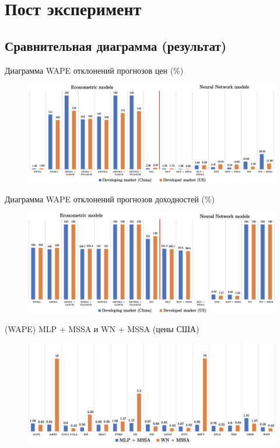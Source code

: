 \documentclass[11pt, aspectratio= 169]{beamer}
\begin{document}
	\section{Пост эксперимент}
	\subsection{Сравнительная диаграмма (результат)}
	\begin{frame}{Диаграмма WAPE отклонений прогнозов цен (\%)}
		\begin{figure}[H]
			\includegraphics[width= 14cm]{table_prices.png}
		\end{figure}
	\end{frame}

	\begin{frame}{Диаграмма WAPE отклонений прогнозов доходностей (\%)}
		\begin{figure}[H]
			\includegraphics[width= 14cm]{table_returns.png}
		\end{figure}
	\end{frame}

	\begin{frame}{(WAPE) MLP + MSSA и WN + MSSA (цены США)}
		\begin{figure}[H]
			\includegraphics[width= 15cm]{./mlp_wn/us.png}
		\end{figure}
	\end{frame}
\end{document}
